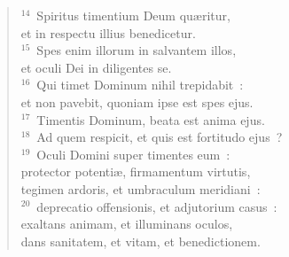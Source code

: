 \begin{flushleft}\begin{verse}${}^{14}$~Spiritus timentium Deum qu\ae ritur,\\ et in respectu illius benedicetur.\\
${}^{15}$~Spes enim illorum in salvantem illos,\\ et oculi Dei in diligentes se.\\
${}^{16}$~Qui timet Dominum nihil trepidabit~:\\ et non pavebit, quoniam ipse est spes ejus.\\
${}^{17}$~Timentis Dominum, beata est anima ejus.\\
${}^{18}$~Ad quem respicit, et quis est fortitudo ejus~?\\
${}^{19}$~Oculi Domini super timentes eum~:\\ protector potenti\ae , firmamentum virtutis,\\ tegimen ardoris, et umbraculum meridiani~:\\
${}^{20}$~deprecatio offensionis, et adjutorium casus~:\\ exaltans animam, et illuminans oculos,\\ dans sanitatem, et vitam, et benedictionem.\end{verse}\end{flushleft}


